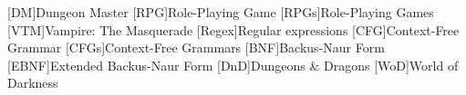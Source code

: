 [DM]{Dungeon Master}
[RPG]{Role-Playing Game}
[RPGs]{Role-Playing Games}
[VTM]{Vampire: The Masquerade}
[Regex]{Regular expressions}
[CFG]{Context-Free Grammar}
[CFGs]{Context-Free Grammars}
[BNF]{Backus-Naur Form}
[EBNF]{Extended Backus-Naur Form}
[DnD]{Dungeons \& Dragons}
[WoD]{World of Darkness}